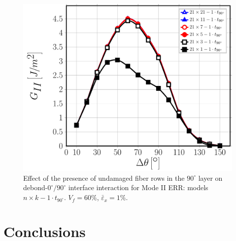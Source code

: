 \begin{figure}[!htb]
\centering
\includegraphics[width=\textwidth]{paperC/nxk-1-vf60-GII.pdf}
\caption{Effect of the presence of undamaged fiber rows in the $90^{\circ}$ layer on debond-$0^{\circ}/90^{\circ}$ interface interaction for Mode II ERR: models $n\times k-1\cdot t_{90^{\circ}}$. $V_{f}=60\%$, $\bar{\varepsilon}_{x}=1\%$.}\label{paperC:fig:nkGII}
\end{figure}


\section{Conclusions}

